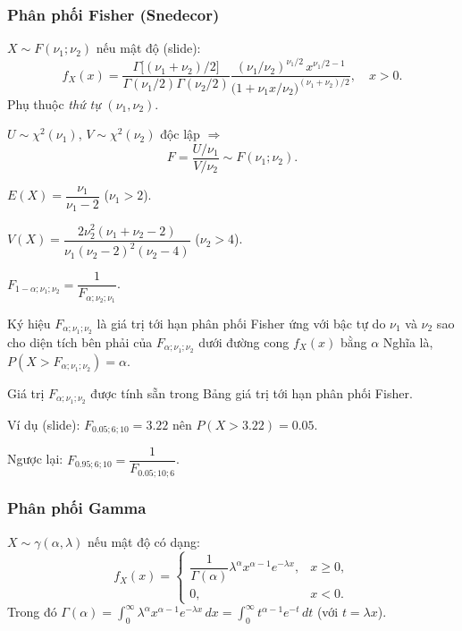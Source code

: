\documentclass[12pt,a4paper]{article}
\begin{document}
\subsubsection{Phân phối Fisher (Snedecor)}

\begin{dinhnghia}
  $X \sim F(\nu_1; \nu_2)$ nếu mật độ (slide):
  \[
    f_X(x) = \dfrac{\Gamma\bigl[(\nu_1+\nu_2)/2\bigr]}{\Gamma(\nu_1/2)\Gamma(\nu_2/2)} \dfrac{(\nu_1/\nu_2)^{\nu_1/2}\, x^{\nu_1/2 - 1}}{\bigl(1 + \nu_1 x / \nu_2\bigr)^{(\nu_1+\nu_2)/2}}, \quad x > 0.
  \]
  Phụ thuộc \emph{thứ tự} $(\nu_1, \nu_2)$.
\end{dinhnghia}

\begin{dinhly}[title={Cấu tạo}]
  $U \sim \chi^2(\nu_1)$, $V \sim \chi^2(\nu_2)$ độc lập $\Rightarrow$
  \[
    F = \dfrac{U/\nu_1}{V/\nu_2} \sim F(\nu_1; \nu_2).
  \]
\end{dinhly}

\begin{dinhly}
  $E(X) = \dfrac{\nu_1}{\nu_1 - 2}$ ($\nu_1 > 2$).

  $V(X) = \dfrac{2\nu_2^2(\nu_1 + \nu_2 - 2)}{\nu_1(\nu_2-2)^2(\nu_2-4)}$ ($\nu_2 > 4$).

  $F_{1-\alpha;\nu_1;\nu_2} = \dfrac{1}{F_{\alpha;\nu_2;\nu_1}}$.
\end{dinhly}

\begin{dinhnghia}[title={Giá trị tới hạn $F_{\alpha;\nu_1;\nu_2}$}]
  Ký hiệu $F_{\alpha;\nu_1;\nu_2}$ là giá trị tới hạn phân phối Fisher ứng với bậc tự do $\nu_1$ và $\nu_2$ sao cho diện tích bên phải của $F_{\alpha;\nu_1;\nu_2}$ dưới đường cong $f_X(x)$ bằng $\alpha$
  Nghĩa là, $P(X > F_{\alpha;\nu_1;\nu_2}) = \alpha$.

  Giá trị $F_{\alpha;\nu_1;\nu_2}$ được tính sẵn trong Bảng giá trị tới hạn phân phối Fisher.

  Ví dụ (slide): $F_{0.05;6;10} = 3.22$ nên $P(X > 3.22) = 0.05$.

  Ngược lại: $F_{0.95;6;10} = \dfrac{1}{F_{0.05;10;6}}$.
\end{dinhnghia}

\subsubsection{Phân phối Gamma}

\begin{dinhnghia}
  $X \sim \gamma(\alpha, \lambda)$ nếu mật độ có dạng:
  \[
    f_X(x) = \begin{cases} \dfrac{1}{\Gamma(\alpha)} \lambda^\alpha x^{\alpha - 1} e^{-\lambda x}, & x \ge 0, \\ 0, & x < 0. \end{cases}
  \]
  Trong đó $\Gamma(\alpha) =  \displaystyle\int_0^{\infty} \lambda^\alpha x^{\alpha - 1} e^{-\lambda x}\,dx = \displaystyle\int_0^{\infty} t^{\alpha - 1} e^{-t}\,dt$ (với $t = \lambda x$).
\end{dinhnghia}
\end{document}
